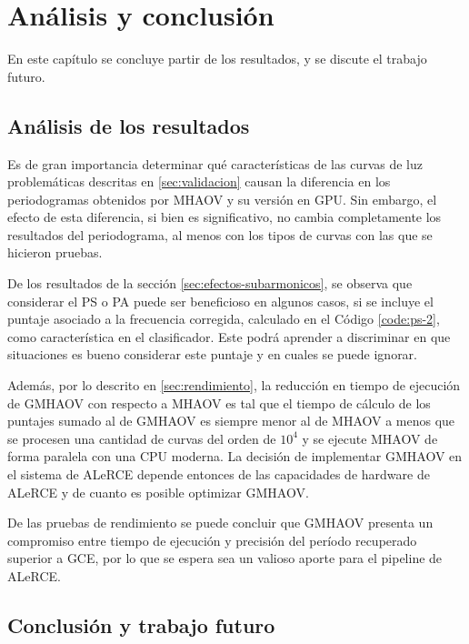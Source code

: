 \chapter{Análisis y conclusión}\label{chap:conclusión}

En este capítulo se concluye partir de los resultados, y se discute el trabajo futuro.

\section{Análisis de los resultados}\label{sec:analisis}

Es de gran importancia determinar qué características de las curvas de luz problemáticas descritas en \ref{sec:validacion} causan la diferencia en los periodogramas obtenidos por MHAOV y su versión en GPU. Sin embargo, el efecto de esta diferencia, si bien es significativo, no cambia completamente los resultados del periodograma, al menos con los tipos de curvas con las que se hicieron pruebas.

De los resultados de la sección \ref{sec:efectos-subarmonicos}, se observa que considerar el PS o PA puede ser beneficioso en algunos casos, si se incluye el puntaje asociado a la frecuencia corregida, calculado en el Código \ref{code:ps-2}, como característica en el clasificador. Este podrá aprender a discriminar en que situaciones es bueno considerar este puntaje y en cuales se puede ignorar. %

Además, por lo descrito en \ref{sec:rendimiento}, la reducción en tiempo de ejecución de GMHAOV con respecto a MHAOV es tal que el tiempo de cálculo de los puntajes sumado al de GMHAOV es siempre menor al de MHAOV a menos que se procesen una cantidad de curvas del orden de $10^{4}$ y se ejecute MHAOV de forma paralela con una CPU moderna. La decisión de implementar GMHAOV en el sistema de ALeRCE depende entonces de las capacidades de hardware de ALeRCE y de cuanto es posible optimizar GMHAOV.

De las pruebas de rendimiento se puede concluir que GMHAOV presenta un compromiso entre tiempo de ejecución y precisión del período recuperado superior a GCE, por lo que se espera sea un valioso aporte para el pipeline de ALeRCE. 

\section{Conclusión y trabajo futuro}\label{sec:conclusion}

